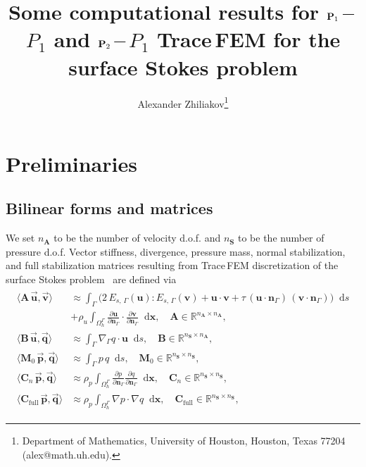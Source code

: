 \documentclass[12pt]{article}
\title{Some computational results for $\vect{P}_1$\,--\,$P_1$ and $\vect{P}_2$\,--\,$P_1$ Trace\,FEM for the surface Stokes problem}
\author{
	Alexander Zhiliakov\thanks{Department of Mathematics, University of Houston, Houston, Texas 77204 (alex@math.uh.edu).}
}
\newcommand{\vect}[1]{\boldsymbol{\mathbf{#1}}}
\newcommand*\diff{\mathop{}\!\mathrm{d}}
\begin{document}
	
\maketitle

\tableofcontents
\vfill
\clearpage
\let\oldtabular\tabular
\renewcommand{\tabular}[1][1.5]{\def\arraystretch{#1}\oldtabular}

\section{Preliminaries}

\subsection{Bilinear forms and matrices}

We set $n_{\vect A}$ to be the number of velocity d.o.f. and $n_{\vect S}$ to be the number of pressure d.o.f. Vector stiffness, divergence, pressure mass, normal stabilization, and full stabilization matrices resulting from Trace\,FEM discretization of the surface Stokes problem~\cite{surfstokes} are defined via
\begin{align}\begin{split}\label{mtx}
	\langle \vect A\,\vec{\vect u}, \vec{\vect v} \rangle &\approx 
		\int_{\Gamma} \big( 2\,E_{s,\,\Gamma}(\vect u) : E_{s,\,\Gamma}(\vect v) + \vect u\cdot\vect v + \tau\,(\vect u\cdot\vect n_\Gamma)\,(\vect v\cdot\vect n_\Gamma) \big) \diff{s} \\
	&+ 
		\rho_u \int_{\Omega_h^{\Gamma}} \frac{\partial \vect u}{\partial\vect n_\Gamma}\cdot\frac{\partial \vect v}{\partial\vect n_\Gamma} \diff{\vect x}, \quad \vect A \in \mathbb R^{n_{\vect A} \times n_{\vect A}},\\
	\langle \vect B\,\vec{\vect u}, \vec{\vect q} \rangle &\approx 
		\int_{\Gamma} \nabla_\Gamma q \cdot \vect u \diff{s}, \quad \vect B \in \mathbb R^{n_{\vect S} \times n_{\vect A}},\\
	\langle \vect M_0\,\vec{\vect p}, \vec{\vect q} \rangle &\approx
		\int_{\Gamma} p\,q \diff{s}, \quad \vect M_0 \in \mathbb R^{n_{\vect S} \times n_{\vect S}},\\
	\langle \vect C_n\,\vec{\vect p}, \vec{\vect q} \rangle &\approx
		\rho_p \int_{\Omega^{\Gamma}_h} \frac{\partial p}{\partial\vect n_\Gamma} \frac{\partial q}{\partial\vect n_\Gamma} \diff{\vect x}, \quad \vect C_n \in \mathbb R^{n_{\vect S} \times n_{\vect S}},\\
	\langle \vect C_{\text{full}}\,\vec{\vect p}, \vec{\vect q} \rangle &\approx
		\rho_p \int_{\Omega^{\Gamma}_h} \nabla p \cdot \nabla q \diff{\vect x}, \quad \vect C_{\text{full}} \in \mathbb R^{n_{\vect S} \times n_{\vect S}},		 
\end{split}\end{align}
\end{document}
